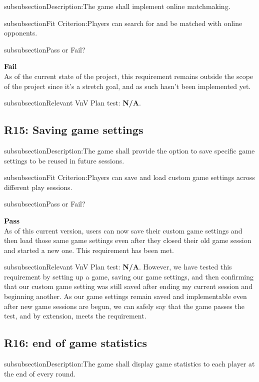 \documentclass[12pt, titlepage]{article}
\begin{document}
\*subsubsection{Description:}The game shall implement online matchmaking.

\*subsubsection{Fit Criterion:}Players can search for and be matched with online opponents.

\*subsubsection{Pass or Fail?} 

 \noindent \textbf{Fail}\\
 
 \noindent As of the current state of the project, this requirement remains outside the scope of the project since it's a stretch goal, and as such hasn't been implemented yet. 

\*subsubsection{Relevant VnV Plan test: } \textbf{N/A}.

\subsection{R15: Saving game settings} 

\*subsubsection{Description:}The game shall provide the option to save specific game settings to be reused in future sessions.

\*subsubsection{Fit Criterion:}Players can save and load custom game settings across different play sessions.


\*subsubsection{Pass or Fail?} 

 \noindent \textbf{Pass}\\
 
 \noindent As of this current version, users can now save their custom game settings and then load those same game settings even after they closed their old game session and started a new one. This requirement has been met.

\*subsubsection{Relevant VnV Plan test: } \textbf{N/A}. However, we have tested this requirement by setting up a game, saving our game settings, and then confirming that our custom game setting was still saved after ending my current session and beginning another. As our game settings remain saved and implementable even after new game sessions are begun, we can safely say that the game passes the test, and by extension, meets the requirement.

\subsection{R16: end of game statistics} 

\*subsubsection{Description:}The game shall display game statistics to each player at the end of every round.
\end{document}
